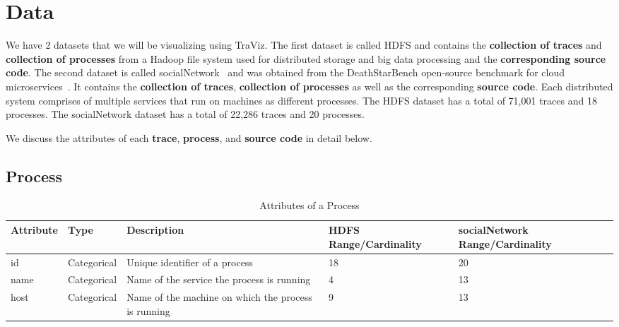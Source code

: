 \section{Data}

We have 2 datasets that we will be visualizing using TraViz.
The first dataset is called HDFS and contains the \textbf{collection of traces} and \textbf{collection of processes}
from a Hadoop file system used for distributed storage 
and big data processing and the \textbf{corresponding source code}.
The second dataset is called socialNetwork~\cite{anand2019deathstarbenchtraces} and was obtained from the DeathStarBench open-source benchmark for cloud microservices~\cite{gan2019deathstar}.
It contains the \textbf{collection of traces}, \textbf{collection of processes} as well as the corresponding \textbf{source code}.
Each distributed system comprises of multiple services that run on machines as different processes.
The HDFS dataset has a total of 71,001 traces and 18 processes.
The socialNetwork dataset has a total of 22,286 traces and 20 processes.

We discuss the attributes of each \textbf{trace}, \textbf{process}, and \textbf{source code} in detail below.

\subsection{Process}

\begin{table*}[]
  \centering
  \begin{adjustbox}{width=1\textwidth}
  \begin{tabular}{|l|l|l|l|l|}
  \hline
  Attribute & Type        & Description                                & HDFS Range/Cardinality & socialNetwork Range/Cardinality \\ \hline
  id        & Categorical & Unique identifier of a process             & 18                     & 20                              \\ \hline
  name      & Categorical & Name of the service the process is running & 4                      & 13                              \\ \hline
  host      & Categorical & Name of the machine on which the process is running & 9 & 13 \\ \hline
  \end{tabular}
\end{adjustbox}

\label{tab:process}
\caption{Attributes of a Process}
\end{table*}

